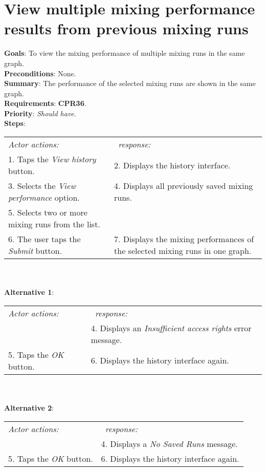     \section{View multiple mixing performance results from previous mixing runs}
  \label{viewmulruns}
  \textbf{Goals}: To view the mixing performance of multiple mixing runs in the same graph.\\
  \textbf{Preconditions}: None.\\
  \textbf{Summary}: The performance of the selected mixing runs are shown in the same graph.\\
  \textbf{Requirements}: \textbf{CPR36}.\\
  \textbf{Priority}: \emph{Should have}.\\
  \textbf{Steps}: \\
  \begin{tabular}{ p{} p{} }
  	\emph{Actor actions:} & \emph{\projectname\ response:} \\
	1. Taps the \emph{View history} button. & 2. Displays the history interface. \\
	3. Selects the \emph{View performance} option. & 4. Displays all previously saved mixing runs.\\
	 5. Selects two or more mixing runs from the list. & \\
	 6. The user taps the \emph{Submit} button. & 7. Displays the mixing performances of the selected mixing runs in one graph.\\
  \end{tabular}
  \\
     \\\textbf{Alternative 1}: \\
    \begin{tabular}{ p{} p{} }
  	\emph{Actor actions:} & \emph{\projectname\ response:} \\
            & 4. Displays an \emph{Insufficient access rights} error message. \\
    5. Taps the \emph{OK} button. & 6. Displays the history interface again. \\
    \end{tabular}
            \\
     \\\textbf{Alternative 2}: \\
    \begin{tabular}{ p{} p{} }
  	\emph{Actor actions:} & \emph{\projectname\ response:} \\
            & 4. Displays a \emph{No Saved Runs} message. \\
    5. Taps the \emph{OK} button. & 6. Displays the history interface again. \\
    \end{tabular}

